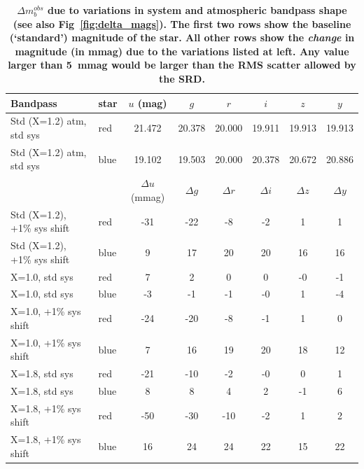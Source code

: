 \documentclass[12pt,preprint]{aastex}
\begin{document}
\begin{center}
\begin{table}[htb]
\caption{{\bf $\Delta m_b^{obs}$ due to variations in system and atmospheric
 bandpass shape (see also Fig~\ref{fig:delta_mags}). The first two
rows show the baseline (`standard') magnitude of the star. All other rows show the 
{\it change} in magnitude (in mmag) due to the variations listed at
left. Any value larger than 5~mmag would be larger than the RMS
scatter allowed by the SRD.} }
\begin{tabular}{l l | c c c c c c}
Bandpass & star &  $u$ (mag) & $g$ & $r$ & $i$ & $z$ & $y$ \\ \hline
Std (X=1.2) atm, std sys  &  red & 21.472 & 20.378 & 20.000 & 19.911 & 19.913 & 19.913 \\
Std (X=1.2) atm, std sys  &  blue & 19.102 & 19.503 & 20.000 & 20.378 & 20.672 & 20.886 \\ \hline \hline
 & & $\Delta u$ (mmag) & $\Delta g$  & $\Delta r$  & $\Delta i$ & $\Delta z$  & $\Delta y$ \\ \hline
Std (X=1.2), +1\% sys shift & red  & -31 & -22 & -8 & -2 & 1 & 1 \\
Std (X=1.2), +1\% sys shift & blue  & 9 & 17 & 20 & 20 & 16 & 16 \\ \hline
X=1.0, std sys & red  & 7 & 2 & 0 & 0 & -0 & -1 \\
X=1.0, std sys & blue  & -3 & -1 & -1 & -0 & 1 & -4 \\ \hline
X=1.0, +1\% sys shift & red & -24 & -20 & -8 & -1 & 1 & 0 \\
X=1.0, +1\% sys shift & blue & 7 & 16 & 19 & 20 & 18 & 12 \\ \hline
X=1.8, std sys  & red & -21 & -10 & -2 & -0 & 0 & 1 \\
X=1.8, std sys  & blue & 8 & 8 & 4 & 2 & -1 & 6 \\ \hline
X=1.8, +1\% sys shift & red & -50 & -30 & -10 & -2 & 1 & 2 \\
X=1.8, +1\% sys shift & blue & 16 & 24 & 24 & 22 & 15 & 22 \\ \hline
\end{tabular}
\label{tab:delta_mags}
\end{table}
\end{center}
\end{document}

